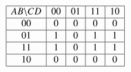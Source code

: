 \begin{align*}
  \begin{array}{|c|c|c|c|c|}\hline
    AB \backslash CD & 00 & 01 & 11 & 10 \\
    \hline
    00 & 0 & 0 & 0 & 0 \\\hline
    01 & 1 & 0 & 1 & 1 \\ \hline
    11 & 1 & 0 & 1 & 1 \\ \hline
    10 & 0 & 0 & 0 & 0 \\ \hline
\end{array}  
\end{align*}
